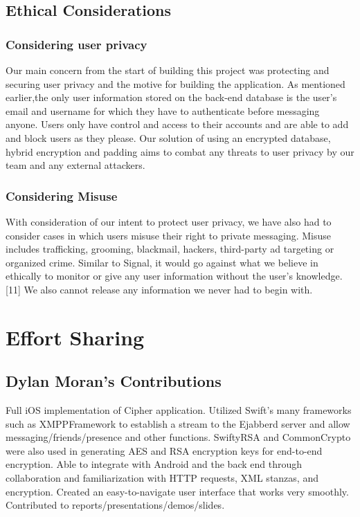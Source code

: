 \documentclass[12pt]{article}
\begin{document}
\subsection{Ethical Considerations}\label{sec:ethical}
\subsubsection{Considering user privacy}
 Our main concern from the start of building this project was protecting and securing user privacy and the motive for building the application. As mentioned earlier,the only user information stored on the back-end database is the user's email and username for which they have to authenticate before messaging anyone. Users only have control and access to their accounts and are able to add and block users as they please. Our solution of using an encrypted database, hybrid encryption and padding aims to combat any threats to user privacy by our team and any external attackers. 
 \subsubsection{Considering Misuse}
 With consideration of our intent to protect user privacy, we have also had to consider cases in which users misuse their right to private messaging. Misuse includes trafficking, grooming, blackmail, hackers, third-party ad targeting or organized crime. Similar to Signal, it would go against what we believe in ethically to monitor or give any user information without the user’s knowledge.[11] We also cannot release any information we never had to begin with.

\section{Effort Sharing}\label{chap:conclusion}
\subsection{Dylan Moran's Contributions}
Full iOS implementation of Cipher application. Utilized Swift’s many frameworks such as XMPPFramework to establish a stream to the Ejabberd server and allow messaging/friends/presence and other functions. SwiftyRSA and CommonCrypto were also used in generating AES and RSA encryption keys for end-to-end encryption. Able to integrate with Android and the back end through collaboration and familiarization with HTTP requests, XML stanzas, and encryption. Created an easy-to-navigate user interface that works very smoothly. Contributed to reports/presentations/demos/slides.
\end{document}
